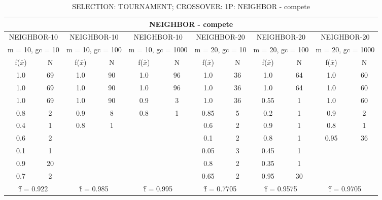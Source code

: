 \begin{table}[H]
	\centering
	\caption{SELECTION: TOURNAMENT; CROSSOVER: 1P: NEIGHBOR - compete}
	\begin{adjustbox}{width=1\textwidth}
		\begin{tabular}{ |c|c||c|c||c|c||c|c||c|c||c|c| }
			\hline
			\multicolumn{12}{|c|}{NEIGHBOR - compete} \\
			\hline
			\multicolumn{2}{|c||}{NEIGHBOR-10} & \multicolumn{2}{c||}{NEIGHBOR-10} & \multicolumn{2}{c||}{NEIGHBOR-10} & \multicolumn{2}{c||}{NEIGHBOR-20} & \multicolumn{2}{c||}{NEIGHBOR-20} & \multicolumn{2}{c|}{NEIGHBOR-20}\\
			\hline
			\multicolumn{2}{|c||}{m = 10, gc = 10} & \multicolumn{2}{c||}{m = 10, gc = 100} & \multicolumn{2}{c||}{m = 10, gc = 1000} & \multicolumn{2}{c||}{m = 20, gc = 10} & \multicolumn{2}{c||}{m = 20, gc = 100} & \multicolumn{2}{c|}{m = 20, gc = 1000}\\
			\hline
			f($\bar{x}$) & N & f($\bar{x}$) & N & f($\bar{x}$) & N & f($\bar{x}$) & N & f($\bar{x}$) & N & f($\bar{x}$) & N\\
			\hline
			\hline
			1.0 & 69 & 1.0 & 90 & 1.0 & 96 & 1.0 & 36 & 1.0 & 64 & 1.0 & 60\\
			\hline
			1.0 & 69 & 1.0 & 90 & 1.0 & 96 & 1.0 & 36 & 1.0 & 64 & 1.0 & 60\\
			1.0 & 69 & 1.0 & 90 & 0.9 & 3 & 1.0 & 36 & 0.55 & 1 & 1.0 & 60\\
			0.8 & 2 & 0.9 & 8 & 0.8 & 1 & 0.85 & 5 & 0.2 & 1 & 0.9 & 2\\
			0.4 & 1 & 0.8 & 1 &   &   & 0.6 & 2 & 0.9 & 1 & 0.8 & 1\\
			0.6 & 2 &   &   &   &   & 0.1 & 2 & 0.8 & 1 & 0.95 & 36\\
			0.1 & 1 &   &   &   &   & 0.05 & 3 & 0.45 & 1 &   &  \\
			0.9 & 20 &   &   &   &   & 0.8 & 2 & 0.35 & 1 &   &  \\
			0.7 & 2 &   &   &   &   & 0.65 & 2 & 0.95 & 30 &   &  \\
			\hline
			\multicolumn{2}{|c||}{\^{f} = 0.922} & \multicolumn{2}{c||}{\^{f} = 0.985} & \multicolumn{2}{c||}{\^{f} = 0.995} & \multicolumn{2}{c||}{\^{f} = 0.7705} & \multicolumn{2}{c||}{\^{f} = 0.9575} & \multicolumn{2}{c|}{\^{f} = 0.9705}\\
			\hline
		\end{tabular}
	\end{adjustbox}
\end{table}

